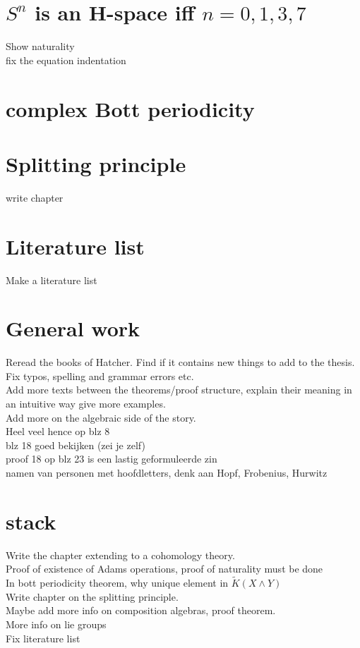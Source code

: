 \documentclass{report}
\begin{document}
\section{$S^n$ is an H-space iff $n = 0,1,3,7$}
Show naturality
\\fix the equation indentation
\section{complex Bott periodicity}
\section{Splitting principle}
write chapter
\section{Literature list}
Make a literature list
\section{General work}
Reread the books of Hatcher. Find if it contains new things to add to the thesis.
\\Fix typos, spelling and grammar errors etc.
\\Add more texts between the theorems/proof structure, explain their meaning in an intuitive way give more examples.
\\Add more on the algebraic side of the story.
\\Heel veel hence op blz 8 
\\blz 18 goed bekijken (zei je zelf)
\\proof 18 op blz 23 is een lastig geformuleerde zin
\\namen van personen met hoofdletters, denk aan Hopf, Frobenius, Hurwitz

\section{stack}
Write the chapter extending to a cohomology theory.
\\Proof of existence of Adams operations, proof of naturality must be done
\\In bott periodicity theorem, why unique element in $\tilde{K}(X \wedge Y)$
\\Write chapter on the splitting principle.
\\Maybe add more info on composition algebras, proof theorem.
\\More info on lie groups
\\Fix literature list
\end{document}
